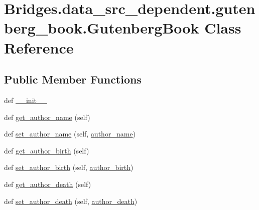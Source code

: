 \hypertarget{class_bridges_1_1data__src__dependent_1_1gutenberg__book_1_1_gutenberg_book}{}\section{Bridges.\+data\+\_\+src\+\_\+dependent.\+gutenberg\+\_\+book.\+Gutenberg\+Book Class Reference}
\label{class_bridges_1_1data__src__dependent_1_1gutenberg__book_1_1_gutenberg_book}
\subsection*{Public Member Functions}
\begin{DoxyCompactItemize}
\item 
def \hyperlink{class_bridges_1_1data__src__dependent_1_1gutenberg__book_1_1_gutenberg_book_a6bea17d23a551bfcace9d53d2897e00b}{\+\_\+\+\_\+init\+\_\+\+\_\+}
\item 
def \hyperlink{class_bridges_1_1data__src__dependent_1_1gutenberg__book_1_1_gutenberg_book_a5b8c826132fd2776947a4217968022a2}{get\+\_\+author\+\_\+name} (self)
\item 
def \hyperlink{class_bridges_1_1data__src__dependent_1_1gutenberg__book_1_1_gutenberg_book_ab40b3c4b2394482fd2210ee9c140cab2}{set\+\_\+author\+\_\+name} (self, \hyperlink{class_bridges_1_1data__src__dependent_1_1gutenberg__book_1_1_gutenberg_book_a270314cd5b6e4bc09c2a54205e3de421}{author\+\_\+name})
\item 
def \hyperlink{class_bridges_1_1data__src__dependent_1_1gutenberg__book_1_1_gutenberg_book_a4465fdc93bf1b8df125a7c16a18f02d4}{get\+\_\+author\+\_\+birth} (self)
\item 
def \hyperlink{class_bridges_1_1data__src__dependent_1_1gutenberg__book_1_1_gutenberg_book_aaefdbca696cfd13d890b86370b8a2376}{set\+\_\+author\+\_\+birth} (self, \hyperlink{class_bridges_1_1data__src__dependent_1_1gutenberg__book_1_1_gutenberg_book_ae3291f767c4e16bd5151686d318ece5a}{author\+\_\+birth})
\item 
def \hyperlink{class_bridges_1_1data__src__dependent_1_1gutenberg__book_1_1_gutenberg_book_a60beab031ce83711dfa1a7b9cba3012f}{get\+\_\+author\+\_\+death} (self)
\item 
def \hyperlink{class_bridges_1_1data__src__dependent_1_1gutenberg__book_1_1_gutenberg_book_a6f999100d0b957b5d777a61b3a3b4f0a}{set\+\_\+author\+\_\+death} (self, \hyperlink{class_bridges_1_1data__src__dependent_1_1gutenberg__book_1_1_gutenberg_book_a73a52fb7898e2dd9958a8b66ac5ceb86}{author\+\_\+death})

\end{DoxyCompactItemize}
